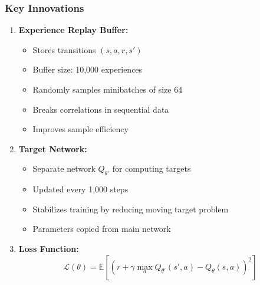 \documentclass[a4paper, 12pt]{article}
\begin{document}
\subsubsection{Key Innovations}
\begin{tcolorbox}[title=DQN Improvements over Q-Learning]
\begin{enumerate}
    \item \textbf{Experience Replay Buffer:}
    \begin{itemize}
        \item Stores transitions $(s, a, r, s')$
        \item Buffer size: 10,000 experiences
        \item Randomly samples minibatches of size 64
        \item Breaks correlations in sequential data
        \item Improves sample efficiency
    \end{itemize}

    \item \textbf{Target Network:}
    \begin{itemize}
        \item Separate network $Q_{\theta'}$ for computing targets
        \item Updated every 1,000 steps
        \item Stabilizes training by reducing moving target problem
        \item Parameters copied from main network
    \end{itemize}

    \item \textbf{Loss Function:}
    \[
    \mathcal{L}(\theta) = \mathbb{E} \left[ \left( r + \gamma \max_a Q_{\theta'}(s', a) - Q_\theta(s, a) \right)^2 \right]
    \]
\end{enumerate}
\end{tcolorbox}
\end{document}
